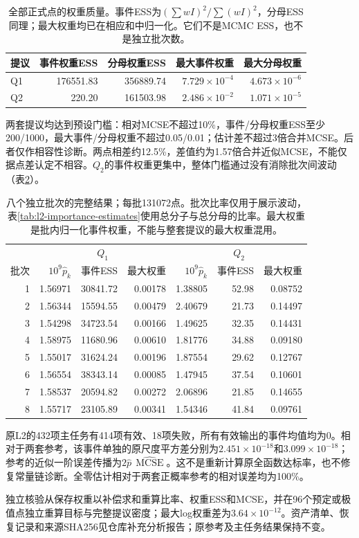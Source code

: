 \begin{table}[htbp]\centering\small
\begin{tabular}{lrrrr}\toprule
提议 & 事件权重ESS & 分母权重ESS & 最大事件权重 & 最大分母权重\\\midrule
Q1 & 176551.83 & 356889.74 & $7.729\times10^{-4}$ & $4.673\times10^{-6}$\\
Q2 & 220.20 & 161503.98 & $2.486\times10^{-2}$ & $1.071\times10^{-5}$\\
\bottomrule\end{tabular}
\caption{全部正式点的权重质量。事件ESS为$(\sum wI)^2/\sum(wI)^2$，分母ESS同理；最大权重均已在相应和中归一化。它们不是MCMC ESS，也不是独立批次数。}
\label{tab:l2-importance-weights}
\end{table}

两套提议均达到预设门槛：相对MCSE不超过10\%，事件/分母权重ESS至少200/1000，最大事件/分母权重不超过0.05/0.01；估计差不超过3倍合并MCSE。后者仅作相容性诊断。两点相差约12.5\%，差值约为1.57倍合并近似MCSE，不能仅据点差认定不相容。$Q_2$的事件权重更集中，整体门槛通过没有消除批次间波动（表\ref{tab:l2-importance-batches}）。

\begin{table}[htbp]\centering\small
\begin{tabular}{rrrrrrr}\toprule
& \multicolumn{3}{c}{$Q_1$} & \multicolumn{3}{c}{$Q_2$}\\
批次 & $10^9\widehat p_k$ & 事件ESS & 最大权重 & $10^9\widehat p_k$ & 事件ESS & 最大权重\\\midrule
1 & 1.56971 & 30841.72 & 0.00178 & 1.38805 & 52.98 & 0.08752\\
2 & 1.56344 & 15594.55 & 0.00479 & 2.40679 & 21.73 & 0.14497\\
3 & 1.54298 & 34723.54 & 0.00166 & 1.49625 & 32.35 & 0.14431\\
4 & 1.58975 & 11680.96 & 0.00610 & 1.81776 & 34.88 & 0.09180\\
5 & 1.55017 & 31624.24 & 0.00196 & 1.87554 & 29.62 & 0.12767\\
6 & 1.56554 & 38343.14 & 0.00085 & 1.47945 & 37.54 & 0.10601\\
7 & 1.58537 & 20594.82 & 0.00272 & 2.06896 & 21.85 & 0.14655\\
8 & 1.55717 & 23105.89 & 0.00341 & 1.54346 & 41.84 & 0.09761\\
\bottomrule\end{tabular}
\caption{八个独立批次的完整结果；每批131072点。批次比率仅用于展示波动，表\ref{tab:l2-importance-estimates}使用总分子与总分母的比率。最大权重是批内归一化事件权重，不能与整套提议的最大权重混用。}
\label{tab:l2-importance-batches}
\end{table}

原L2的432项主任务有414项有效、18项失败，所有有效输出的事件均值均为0。相对于两套参考，该事件单独的原尺度平方差分别为$2.451\times10^{-18}$和$3.099\times10^{-18}$；参考的近似一阶误差传播为$2\widehat p\,\widehat{\operatorname{MCSE}}$。这不是重新计算原全函数达标率，也不修复常量链诊断。全零估计相对于两套正概率参考的相对误差均为100\%。

独立核验从保存权重以补偿求和重算比率、权重ESS和MCSE，并在96个预定或极值点独立重算目标与完整提议密度；最大log权重差为$3.64\times10^{-12}$。资产清单、恢复记录和来源SHA256见仓库补充分析报告；原参考及主任务结果保持不变。
